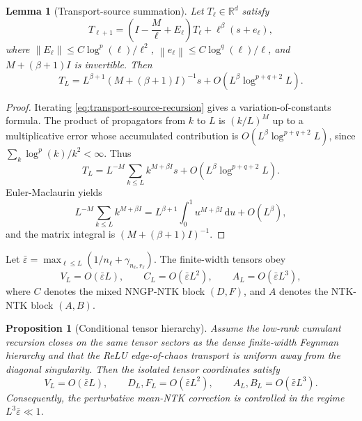 \documentclass{article}
\newtheorem{proposition}[theorem]{Proposition}
\newtheorem{lemma}[theorem]{Lemma}
\newcommand{\R}{\mathbb R}
\newcommand{\barE}{\bar\varepsilon}
\newcommand{\dd}{\mathrm d}
\newcommand{\norm}[1]{\left\lVert #1\right\rVert}
\begin{document}
\begin{lemma}[Transport-source summation]
\label{lem:transport-source}
Let \(T_\ell\in\R^d\) satisfy
\begin{equation}
T_{\ell+1}
=\left(I-\frac{M}{\ell}+E_\ell\right)T_\ell+\ell^\beta(s+e_\ell),
\label{eq:transport-source-recursion}
\end{equation}
where \(\norm{E_\ell}\le C\log^p(\ell)/\ell^2\), \(\norm{e_\ell}\le C\log^q(\ell)/\ell\), and \(M+(\beta+1)I\) is invertible. Then
\begin{equation}
T_L
=L^{\beta+1}\left(M+(\beta+1)I\right)^{-1}s
+O\left(L^\beta\log^{p+q+2}L\right).
\label{eq:transport-source-solution}
\end{equation}
\end{lemma}

\begin{proof}
Iterating \eqref{eq:transport-source-recursion} gives a variation-of-constants formula. The product of propagators from \(k\) to \(L\) is \((k/L)^M\) up to a multiplicative error whose accumulated contribution is \(O(L^\beta\log^{p+q+2}L)\), since \(\sum_k\log^p(k)/k^2<\infty\). Thus
\[
T_L=L^{-M}\sum_{k\le L} k^{M+\beta I}s+O(L^\beta\log^{p+q+2}L).
\]
Euler-Maclaurin yields
\[
L^{-M}\sum_{k\le L} k^{M+\beta I}
=L^{\beta+1}\int_0^1u^{M+\beta I}\,\dd u+O(L^\beta),
\]
and the matrix integral is \((M+(\beta+1)I)^{-1}\).
\end{proof}

Let \(\barE=\max_{\ell\le L}(1/n_\ell+\gamma_{n_\ell,r_\ell})\). The finite-width tensors obey
\begin{equation}
V_L=O(\barE L),\qquad C_L=O(\barE L^2),\qquad A_L=O(\barE L^3),
\label{eq:main-scales}
\end{equation}
where \(C\) denotes the mixed NNGP-NTK block \((D,F)\), and \(A\) denotes the NTK-NTK block \((A,B)\).

\begin{proposition}[Conditional tensor hierarchy]
\label{prop:tensor-hierarchy}
Assume the low-rank cumulant recursion closes on the same tensor sectors as the dense finite-width Feynman hierarchy and that the ReLU edge-of-chaos transport is uniform away from the diagonal singularity. Then the isolated tensor coordinates satisfy
\begin{equation}
V_L=O(\barE L),\qquad
D_L,F_L=O(\barE L^2),\qquad
A_L,B_L=O(\barE L^3).
\label{eq:tensor-hierarchy}
\end{equation}
Consequently, the perturbative mean-NTK correction is controlled in the regime \(L^3\barE\ll 1\).
\end{proposition}
\end{document}
